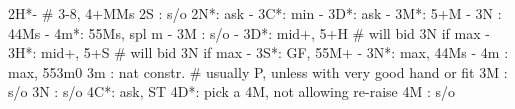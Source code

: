 2H*- # 3-8, 4+MMs
2S : s/o
2N*: ask
   - 3C*: min
		- 3D*: ask
			 - 3M*: 5+M
			 - 3N : 44Ms
			 - 4m*: 55Ms, spl m
		- 3M : s/o
   - 3D*: mid+, 5+H  # will bid 3N if max
   - 3H*: mid+, 5+S  # will bid 3N if max
   - 3S*: GF, 55M+
   - 3N*: max, 44Ms
   - 4m : max, 553m0
3m : nat constr.  # usually P, unless with very good hand or fit
3M : s/o
3N : s/o
4C*: ask, ST
4D*: pick a 4M, not allowing re-raise
4M : s/o
